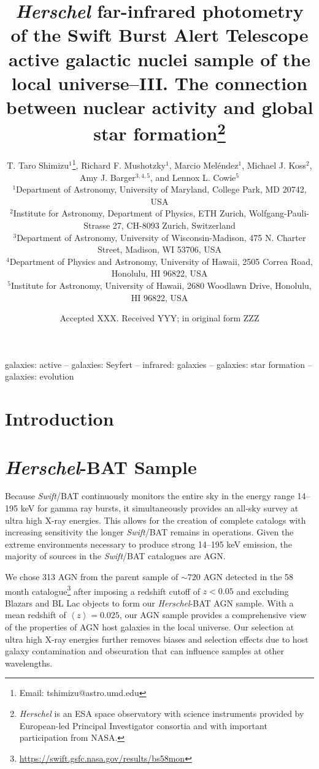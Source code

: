 \documentclass[fleqn,usenatbib]{mnras}
\title[\emph{Herschel}-BAT Sample: AGN-SF Connection]{\emph{Herschel} far-infrared photometry of the Swift Burst Alert
Telescope active galactic nuclei sample of the local universe--III. The connection between nuclear activity and global star formation\thanks{{\it Herschel} is an ESA space observatory with science instruments provided by European-led Principal Investigator consortia and with important participation from NASA.}}
\author[T. T. Shimizu]{T. Taro Shimizu$^{1}$\thanks{Email: tshimizu@astro.umd.edu}, Richard F. Mushotzky$^1$, Marcio Mel\'endez$^1$, Michael J. Koss$^{2}$, \newauthor Amy J. Barger$^{3,4,5}$, and Lennox L. Cowie$^{5}$\\
$^{1}$Department of Astronomy, University of Maryland, College Park, MD 20742, USA\\
$^{2}$Institute for Astronomy, Department of Physics, ETH Zurich, Wolfgang-Pauli-Strasse 27, CH-8093 Zurich, Switzerland\\
$^{3}$Department of Astronomy, University of Wisconsin-Madison, 475 N. Charter Street, Madison, WI 53706, USA\\
$^{4}$Department of Physics and Astronomy, University of Hawaii, 2505 Correa Road, Honolulu, HI 96822, USA\\
$^{5}$Institute for Astronomy, University of Hawaii, 2680 Woodlawn Drive, Honolulu, HI 96822, USA}
\date{Accepted XXX. Received YYY; in original form ZZZ}
\newcommand{\herschel}{\emph{Herschel}}
\newcommand{\swift}{\textit{Swift}}
\begin{document}
\label{firstpage}
\pagerange{\pageref{firstpage}--\pageref{lastpage}}
\maketitle

\begin{abstract}

\end{abstract}

\begin{keywords}
galaxies: active -- galaxies: Seyfert -- infrared: galaxies -- galaxies: star formation -- galaxies: evolution 
\end{keywords}



\section{Introduction}

\section{\herschel-BAT Sample}
Because \swift/BAT continuously monitors the entire sky in the energy range 14--195 keV for gamma ray bursts, it simultaneously provides an all-sky survey at ultra high X-ray energies. This allows for the creation of complete catalogs with increasing sensitivity the longer \swift/BAT remains in operations. Given the extreme environments necessary to produce strong 14--195 keV emission, the majority of sources in the \swift/BAT catalogues are AGN.

We chose 313 AGN from the parent sample of $\sim720$ AGN detected in the 58 month catalogue\footnote{\url{https://swift.gsfc.nasa.gov/results/bs58mon}} after imposing a redshift cutoff of $z<0.05$ and excluding Blazars and BL Lac objects to form our \herschel-BAT AGN sample. With a mean redshift of $\left<z\right> = 0.025$, our AGN sample provides a comprehensive view of the properties of AGN host galaxies in the local universe. Our selection at ultra high X-ray energies further removes biases and selection effects due to host galaxy contamination and obscuration \citep{Mushotzky:2004gf} that can influence samples at other wavelengths.   
\end{document}
